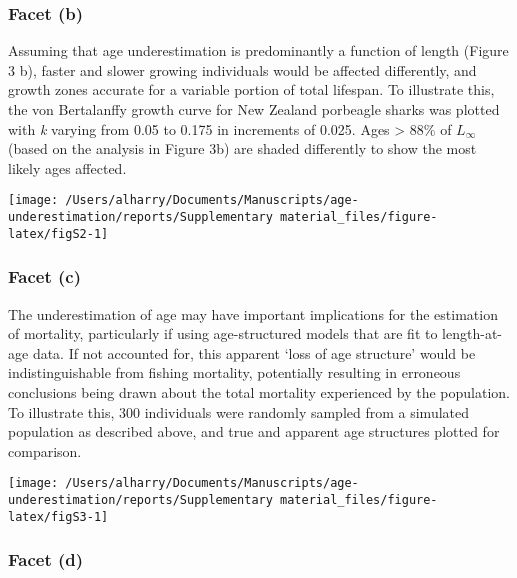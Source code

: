 \documentclass[]{article}
\begin{document}
\subsubsection{Facet (b)}\label{facet-b}

Assuming that age underestimation is predominantly a function of length
(Figure 3 b), faster and slower growing individuals would be affected
differently, and growth zones accurate for a variable portion of total
lifespan. To illustrate this, the von Bertalanffy growth curve for New
Zealand porbeagle sharks was plotted with \emph{k} varying from 0.05 to
0.175 in increments of 0.025. Ages \textgreater{} 88\% of \(L_\infty\)
(based on the analysis in Figure 3b) are shaded differently to show the
most likely ages affected.

\begin{center}\texttt{[image: /Users/alharry/Documents/Manuscripts/age-underestimation/reports/Supplementary material\_files/figure-latex/figS2-1]} \end{center}

\subsubsection{Facet (c)}\label{facet-c}

The underestimation of age may have important implications for the
estimation of mortality, particularly if using age-structured models
that are fit to length-at-age data. If not accounted for, this apparent
`loss of age structure' would be indistinguishable from fishing
mortality, potentially resulting in erroneous conclusions being drawn
about the total mortality experienced by the population. To illustrate
this, 300 individuals were randomly sampled from a simulated population
as described above, and true and apparent age structures plotted for
comparison.

\begin{center}\texttt{[image: /Users/alharry/Documents/Manuscripts/age-underestimation/reports/Supplementary material\_files/figure-latex/figS3-1]} \end{center}

\subsubsection{Facet (d)}\label{facet-d}
\end{document}
